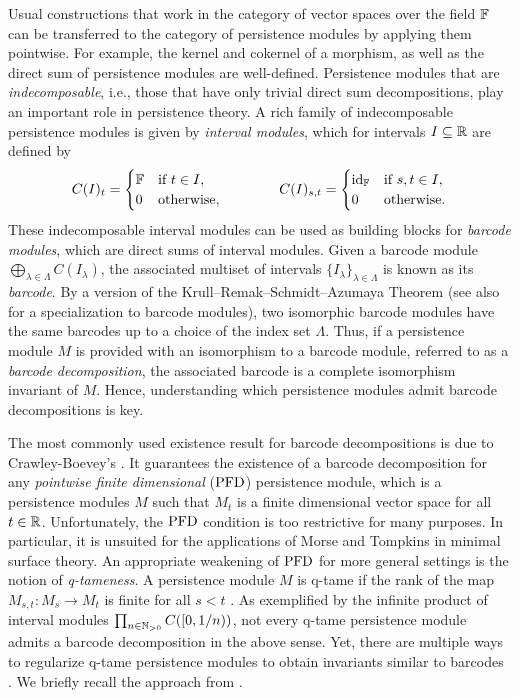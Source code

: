 Usual constructions that work in the category of vector spaces over the field $\mathbb{F}$ can be transferred to the category of persistence modules by applying them pointwise.
For example, the kernel and cokernel of a morphism, as well as the direct sum of persistence modules are well-defined.
Persistence modules that are \emph{indecomposable}, i.e., those that have only trivial direct sum decompositions, play an important role in persistence theory.
A rich family of indecomposable persistence modules is given by \emph{interval modules}, which for intervals $I \subseteq \mathbb{R}$ are defined by
\begin{equation*}
C(I)_t =
\begin{cases}
\mathbb{F} & \text{if } t \in I, \\
0 & \text{otherwise},
\end{cases}
\qquad \qquad
C(I)_{s, t} =
\begin{cases}
\operatorname{id}_{\mathbb{F}} & \text{if } s, t \in I, \\
0 & \text{otherwise}.
\end{cases}
\end{equation*}
These indecomposable interval modules can be used as building blocks for \emph{barcode modules}, which are direct sums of interval modules.
Given a barcode module $\bigoplus_{\lambda \in \Lambda} C(I_{\lambda})$, the associated multiset of intervals $\{I_{\lambda}\}_{\lambda \in \Lambda}$ is known as its \emph{barcode}.
By a version of the Krull--Remak--Schmidt--Azumaya Theorem \cite{Azumaya.1950} (see also \cite[Theorem 2.7]{Chazal.2016a} for a specialization to barcode modules), two isomorphic barcode modules have the same barcodes up to a choice of the index set $\Lambda$.
Thus, if a persistence module $M$ is provided with an isomorphism to a barcode module, referred to as a \emph{barcode decomposition}, the associated barcode is a complete isomorphism invariant of $M$.
Hence, understanding which persistence modules admit barcode decompositions is key.

The most commonly used existence result for barcode decompositions is due to Crawley-Boevey's \cite{Crawley-Boevey.2015}.
It guarantees the existence of a barcode decomposition for any \emph{pointwise finite dimensional} ($\mathrm{PFD}$) persistence module, which is a persistence modules $M$ such that $M_t$ is a finite dimensional vector space for all $t \in \mathbb{R}$.
Unfortunately, the $\mathrm{PFD}$ condition is too restrictive for many purposes.
In particular, it is unsuited for the applications of Morse and Tompkins in minimal surface theory.
An appropriate weakening of $\mathrm{PFD}$ for more general settings is the notion of \emph{q-tameness}.
A persistence module $M$ is q-tame if the rank of the map $M_{s,t} \colon M_s \to M_t$ is finite for all $s < t$ \cite{Chazal.2016a}.
As exemplified by the infinite product of interval modules $\prod_{n \in \mathbb{N}_{> 0}} C([0,1/n))$, not every q-tame persistence module admits a barcode decomposition in the above sense.
Yet, there are multiple ways to regularize q-tame persistence modules to obtain invariants similar to barcodes \cite{Chazal.2016a, Chazal.2016b, Schmahl.2021}.
We briefly recall the approach from \cite{Chazal.2016b}.

